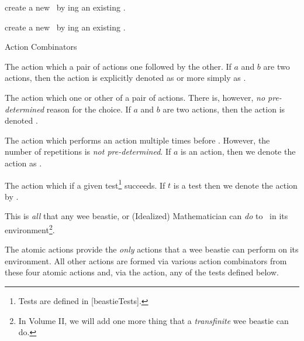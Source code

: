 \item create a new \lol\ by ing an existing \lol. 

\item create a new \lol\ by ing an existing \lol. 

\stopitemize

\item Action Combinators

\startitemize[n]

\item The action which  a pair of actions one followed by 
the other. If $a$ and $b$ are two actions, then the  
action is explicitly denoted as  or more 
simply as . 

\item The action which  one or other of a pair of actions. 
There is, however, \emph{no pre-determined} reason for the choice. If $a$ 
and $b$ are two actions, then the  
action is denoted .


\item The action which performs an action multiple times before 
. However, the number of repetitions is \emph{not 
pre-determined}. If $a$ is an action, then we denote the 
 action as . 

\item The action which  if a given test\footnote{Tests 
are defined in [beastieTests].} succeeds. If $t$ is a test 
then we denote the  action by . 

\stopitemize

\stopitemize

\noindent This is \emph{all} that any wee beastie, or (Idealized) 
Mathematician can \emph{do} to \lols\ in its environment\footnote{In 
Volume II, we will add one more thing that a \emph{transfinite} wee 
beastie can do.}. 

\stopDefinition

\startMMundi

The atomic actions provide the \emph{only} actions that a wee beastie can 
perform \emph{} on its environment. All other actions are 
formed via various action combinators from these four atomic actions and, 
via the  action, any of the tests defined below. 

